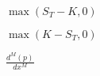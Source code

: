 \documentclass{article}
\begin{document}
$\max(S_T - K, 0)$
\pagebreak

$\max(K - S_T, 0)$
\pagebreak

$\frac{d^{M}(p)}{dx^{M}}$
\pagebreak
\end{document}
